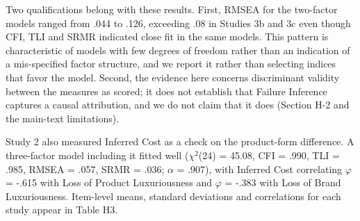 \documentclass[12pt, a4paper]{article}
\begin{document}
Two qualifications belong with these results. First, RMSEA for the two-factor models ranged from .044 to .126, exceeding .08 in Studies 3b and 3c even though CFI, TLI and SRMR indicated close fit in the same models. This pattern is characteristic of models with few degrees of freedom rather than an indication of a mis-specified factor structure, and we report it rather than selecting indices that favor the model. Second, the evidence here concerns discriminant validity between the measures as scored; it does not establish that Failure Inference captures a causal attribution, and we do not claim that it does (Section H-2 and the main-text limitations).

Study 2 also measured Inferred Cost as a check on the product-form difference. A three-factor model including it fitted well ($\chi^2$(24) = 45.08, CFI = .990, TLI = .985, RMSEA = .057, SRMR = .036; $\alpha$ = .907), with Inferred Cost correlating $\varphi$ = -.615 with Loss of Product Luxuriousness and $\varphi$ = -.383 with Loss of Brand Luxuriousness. Item-level means, standard deviations and correlations for each study appear in Table H3.
\end{document}
